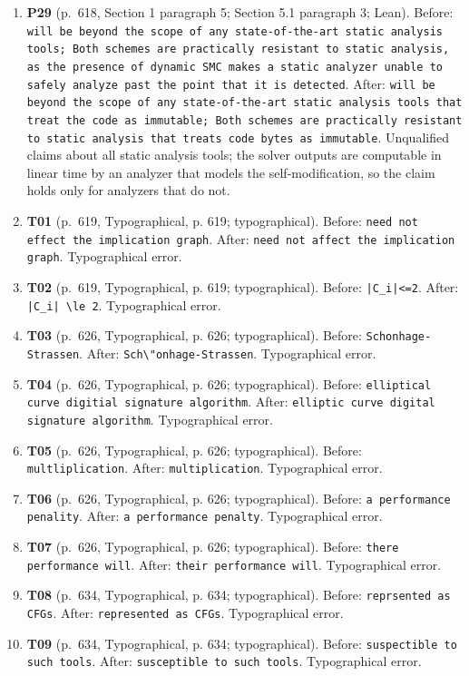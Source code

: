 \documentclass[9pt,twocolumn]{article}
\begin{document}
\begin{enumerate}[label=]
\item \textbf{P29} (p.~618, Section 1 paragraph 5; Section 5.1 paragraph 3; Lean). Before: \texttt{will be beyond the scope of any state-of-the-art static analysis tools; Both schemes are practically resistant to static analysis, as the presence of dynamic SMC makes a static analyzer unable to safely analyze past the point that it is detected}. After: \texttt{will be beyond the scope of any state-of-the-art static analysis tools that treat the code as immutable; Both schemes are practically resistant to static analysis that treats code bytes as immutable}. Unqualified claims about all static analysis tools; the solver outputs are computable in linear time by an analyzer that models the self-modification, so the claim holds only for analyzers that do not. 
\item \textbf{T01} (p.~619, Typographical, p. 619; typographical). Before: \texttt{need not effect the implication graph}. After: \texttt{need not affect the implication graph}. Typographical error. 
\item \textbf{T02} (p.~619, Typographical, p. 619; typographical). Before: \texttt{|C\_i|<=2}. After: \texttt{|C\_i| \textbackslash{}le 2}. Typographical error. 
\item \textbf{T03} (p.~626, Typographical, p. 626; typographical). Before: \texttt{Schonhage-Strassen}. After: \texttt{Sch\textbackslash{}"onhage-Strassen}. Typographical error. 
\item \textbf{T04} (p.~626, Typographical, p. 626; typographical). Before: \texttt{elliptical curve digitial signature algorithm}. After: \texttt{elliptic curve digital signature algorithm}. Typographical error. 
\item \textbf{T05} (p.~626, Typographical, p. 626; typographical). Before: \texttt{multliplication}. After: \texttt{multiplication}. Typographical error. 
\item \textbf{T06} (p.~626, Typographical, p. 626; typographical). Before: \texttt{a performance penality}. After: \texttt{a performance penalty}. Typographical error. 
\item \textbf{T07} (p.~626, Typographical, p. 626; typographical). Before: \texttt{there performance will}. After: \texttt{their performance will}. Typographical error. 
\item \textbf{T08} (p.~634, Typographical, p. 634; typographical). Before: \texttt{reprsented as CFGs}. After: \texttt{represented as CFGs}. Typographical error. 
\item \textbf{T09} (p.~634, Typographical, p. 634; typographical). Before: \texttt{suspectible to such tools}. After: \texttt{susceptible to such tools}. Typographical error. 

\end{enumerate}
\end{document}
